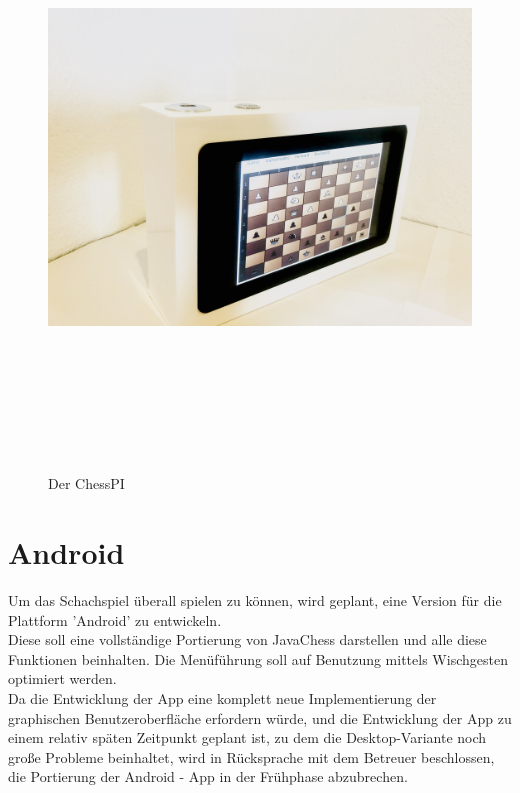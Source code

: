 \documentclass[12pt,a4paper]{article}
\begin{document}
\begin{figure}[H]
  \centering
		\includegraphics[height =  16cm, angle=90]{graphics/chesspi.jpg}
		\caption{Der ChessPI}
		\label{fig:case}
\end{figure}

\clearpage\vfill\newpage{}
\section{Android}
\label{SEC:android}

Um das Schachspiel überall spielen zu können, wird geplant, eine Version für die Plattform 'Android' zu entwickeln. \\
Diese soll eine vollständige Portierung von JavaChess darstellen und alle diese Funktionen beinhalten. Die Menüführung soll auf Benutzung mittels Wischgesten optimiert werden.\\ [2ex]
Da die Entwicklung der App eine komplett neue Implementierung der graphischen Benutzeroberfläche erfordern würde, und die Entwicklung der App zu einem relativ späten Zeitpunkt geplant ist, zu dem die Desktop-Variante noch große Probleme beinhaltet, wird in Rücksprache mit dem Betreuer beschlossen, die Portierung der Android - App in der Frühphase abzubrechen. 
\end{document}
